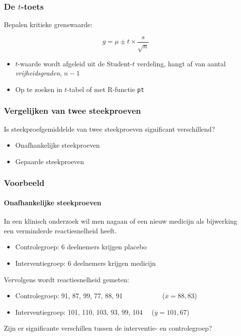 \documentclass{beamer}
\begin{document}
\begin{frame}
  \frametitle{De $t$-toets}
  
  Bepalen kritieke grenswaarde:
  
  \[ g = \mu \pm t \times \frac{s}{\sqrt{n}} \]
  
  \begin{itemize}
    \item $t$-waarde wordt afgeleid uit de Student-$t$ verdeling, hangt af van aantal \emph{vrijheidsgraden}, $n-1$
    \item Op te zoeken in $t$-tabel of met R-functie \texttt{pt}
  \end{itemize}
  
\end{frame}

\begin{frame}
  \frametitle{Vergelijken van twee steekproeven}
  
  Is steekproefgemiddelde van twee steekproeven significant verschillend?
  
  \begin{itemize}
    \item Onafhankelijke steekproeven
    \item Gepaarde steekproeven
  \end{itemize}
\end{frame}

\begin{frame}
  \frametitle{Voorbeeld}
  \framesubtitle{Onafhankelijke steekproeven}
  
  In een klinisch onderzoek wil men nagaan of een nieuw medicijn als bijwerking een verminderde reactiesnelheid heeft.
  
  \begin{itemize}
    \item Controlegroep: 6 deelnemers krijgen placebo
    \item Interventiegroep: 6 deelnemers krijgen medicijn
  \end{itemize}
  
  Vervolgens wordt reactiesnelheid gemeten:
  
  \begin{itemize}
    \item Controlegroep: 91, 87, 99, 77, 88, 91 ~~~~~~~~~~~($\overline{x}=88,83$)
    \item Interventiegroep: 101, 110, 103, 93, 99, 104 ~~($\overline{y}=101,67$)
  \end{itemize}
  
  Zijn er significante verschillen tussen de interventie- en controlegroep?
\end{frame}
\end{document}
